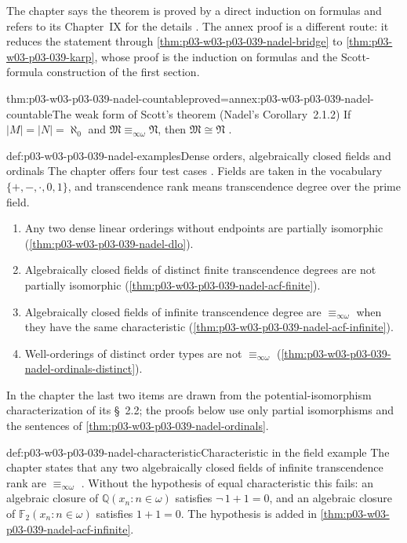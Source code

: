 The chapter says the theorem is proved by a direct induction on formulas and
refers to its Chapter~IX for the details \cite[p.~277]{Nadel1985Admissible}.
The annex proof is a different route: it reduces the statement through
\cref{thm:p03-w03-p03-039-nadel-bridge} to
\cref{thm:p03-w03-p03-039-karp}, whose proof is the induction on formulas
and the Scott-formula construction of the first section.

\begin{hbcorollary}{thm:p03-w03-p03-039-nadel-countable}{proved=annex:p03-w03-p03-039-nadel-countable}{The weak form of Scott's theorem (Nadel's Corollary~2.1.2)}
If \(\lvert M\rvert=\lvert N\rvert=\aleph_0\) and
\(\mathfrak M\equiv_{\infty\omega}\mathfrak N\), then
\(\mathfrak M\cong\mathfrak N\)
\cite[Cor.~2.1.2, p.~277]{Nadel1985Admissible}.
\end{hbcorollary}

\begin{hbexample}{def:p03-w03-p03-039-nadel-examples}{Dense orders, algebraically closed fields and ordinals}
The chapter offers four test cases \cite[pp.~277--278]{Nadel1985Admissible}.
Fields are taken in the vocabulary \(\{+,-,\cdot,0,1\}\), and transcendence
rank means transcendence degree over the prime field.
\begin{enumerate}
\item Any two dense linear orderings without endpoints are partially
      isomorphic (\cref{thm:p03-w03-p03-039-nadel-dlo}).
\item Algebraically closed fields of distinct finite transcendence degrees
      are not partially isomorphic (\cref{thm:p03-w03-p03-039-nadel-acf-finite}).
\item Algebraically closed fields of infinite transcendence degree are
      \(\equiv_{\infty\omega}\) when they have the same characteristic
      (\cref{thm:p03-w03-p03-039-nadel-acf-infinite}).
\item Well-orderings of distinct order types are not \(\equiv_{\infty\omega}\)
      (\cref{thm:p03-w03-p03-039-nadel-ordinals-distinct}).
\end{enumerate}
In the chapter the last two items are drawn from the potential-isomorphism
characterization of its \S~2.2; the proofs below use only partial
isomorphisms and the sentences of
\cref{thm:p03-w03-p03-039-nadel-ordinals}.
\end{hbexample}

\begin{hbwarning}{def:p03-w03-p03-039-nadel-characteristic}{Characteristic in the field example}
The chapter states that any two algebraically closed fields of infinite
transcendence rank are \(\equiv_{\infty\omega}\)
\cite[p.~278]{Nadel1985Admissible}. Without the hypothesis of equal
characteristic this fails: an algebraic closure of
\(\mathbb Q(x_n:n\in\omega)\) satisfies \(\neg\,1+1=0\), and an algebraic
closure of \(\mathbb F_2(x_n:n\in\omega)\) satisfies \(1+1=0\). The
hypothesis is added in \cref{thm:p03-w03-p03-039-nadel-acf-infinite}.
\end{hbwarning}

